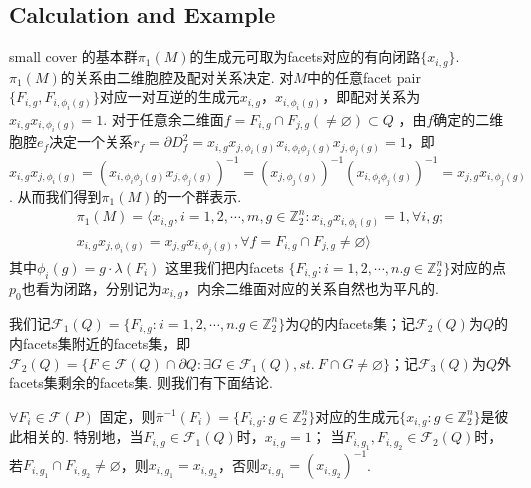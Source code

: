 \documentclass{article}
\theoremstyle{plain}%
\theoremstyle{definition}
\theoremstyle{remark}
\begin{document}
{\subsection{Calculation and Example}
small cover 的基本群$\pi_1(M)$的生成元可取为facets对应的有向闭路$\{x_{i,g}\}$.  $\pi_1(M)$的关系由二维胞腔及配对关系决定. 
对$M$中的任意facet pair  $\{F_{i,g},F_{i,\phi_i(g)}\}$对应一对互逆的生成元$x_{i,g}$，$x_{i,\phi_i(g)}$，即配对关系为$x_{i,g}x_{i,\phi_i(g)}=1$.  
对于任意余二维面$f=F_{i,g}\cap F_{j,g}(\neq \varnothing)\subset Q$
，由$f$确定的二维胞腔$e_f$决定一个关系$r_f=\partial D^2_f=x_{i,g}x_{j,\phi_i(g)}x_{i,\phi_i\phi_j(g)}x_{j,\phi_j(g)}=1$，即$x_{i,g}x_{j,\phi_i(g)}=(x_{i,\phi_i\phi_j(g)}x_{j,\phi_j(g)})^{-1}=(x_{j,\phi_j(g)})^{-1}(x_{i,\phi_i\phi_j(g)})^{-1}=x_{j,g}x_{i,\phi_j(g)}$. 
从而我们得到$\pi_1(M)$的一个群表示.
\begin{multline}\label{eq0}
\pi_1(M)=\langle x_{i,g},i=1,2,\cdots,m,g\in \mathbb{Z}_2^n:x_{i,g}x_{i,\phi_i(g)}=1,\forall i,g;\\
x_{i,g}x_{j,\phi_i(g)}=x_{j,g}x_{i,\phi_j(g)},\forall f=F_{i,g}\cap F_{j,g}\neq \varnothing\rangle
\end{multline}
其中$\phi_i(g)=g\cdot\lambda(F_i)$
{\rem 这里我们把内facets $\{F_{i,g}:i=1,2,\cdots,n. g\in\mathbb{Z}_2^n\}$对应的点$p_0$也看为闭路，分别记为$x_{i,g}$，内余二维面对应的关系自然也为平凡的.}

我们记$\mathcal{F}_1(Q)=\{F_{i,g}:i=1,2,\cdots,n. g\in\mathbb{Z}_2^n\}$为$Q$的内facets集；记$\mathcal{F}_2(Q)$为$Q$的内facets集附近的facets集，即$\mathcal{F}_2(Q)=\{F\in \mathcal{F}(Q)\cap \partial{Q}:\exists G \in\mathcal{F}_1(Q), st.~ F\cap G\neq \varnothing \}$；记$\mathcal{F}_3(Q)$为$Q$外facets集剩余的facets集. 则我们有下面结论.
{\lem \label{lem3}
$\forall F_i\in \mathcal{F}(P)$ 固定，则$\bar{\pi}^{-1}(F_i)=\{F_{i,g}:g\in\mathbb{Z}_2^n\}$对应的生成元$\{x_{i,g}:g\in\mathbb{Z}_2^n\}$是彼此相关的. 特别地，当$F_{i,g}\in \mathcal{F}_1(Q)$时，$x_{i,g}=1$； 当$F_{i,g_1}, F_{i,g_2}\in \mathcal{F}_2(Q)$时，若$F_{i,g_1}\cap F_{i,g_2}\neq \varnothing$，则$x_{i,g_1}= x_{i,g_2}$，否则$x_{i,g_1}= (x_{i,g_2})^{-1}$.

}}
\end{document}

